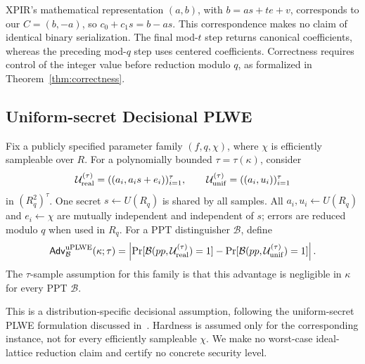 XPIR's mathematical representation \((a,b)\), with \(b=as+te+v\), corresponds
to our \(C=(b,-a)\), so \(c_0+c_1s=b-as\). This correspondence makes no claim
of identical binary serialization. The final mod-\(t\) step returns canonical
coefficients, whereas the preceding mod-\(q\) step uses centered coefficients.
Correctness requires control of the integer value before reduction modulo
\(q\), as formalized in Theorem~\ref{thm:correctness}.

\subsection{Uniform-secret Decisional PLWE}
\label{sec:rlwe-plwe}
\begin{definition}
\label{def:uplwe}
Fix a publicly specified parameter family \((f,q,\chi)\), where \(\chi\)
is efficiently sampleable over \(R\). For a polynomially bounded
\(\tau=\tau(\kappa)\), consider
\[
 \mathcal U_{\rm real}^{(\tau)}
   =((a_i,a_i s+e_i))_{i=1}^{\tau},\qquad
 \mathcal U_{\rm unif}^{(\tau)}
   =((a_i,u_i))_{i=1}^{\tau}
\]
in \((R_q^2)^\tau\). One secret \(s\leftarrow U(R_q)\) is shared by all
samples. All \(a_i,u_i\leftarrow U(R_q)\) and \(e_i\leftarrow\chi\)
are mutually independent and independent of \(s\); errors are reduced
modulo \(q\) when used in \(R_q\). For a PPT distinguisher \(\mathcal B\), define
\[
 \mathsf{Adv}^{\rm uPLWE}_{\mathcal B}(\kappa;\tau)=
 \left|\Pr[\mathcal B(pp,\mathcal U_{\rm real}^{(\tau)})=1]
       -\Pr[\mathcal B(pp,\mathcal U_{\rm unif}^{(\tau)})=1]\right|.
\]
The \(\tau\)-sample assumption for this family is that this advantage is
negligible in \(\kappa\) for every PPT \(\mathcal B\).
\end{definition}
This is a distribution-specific decisional assumption, following the
uniform-secret PLWE formulation discussed in~\cite[Sec.~2]{homomorphic}.
Hardness is assumed only for the corresponding instance, not for every
efficiently sampleable \(\chi\). We make no worst-case ideal-lattice
reduction claim and certify no concrete security level.
